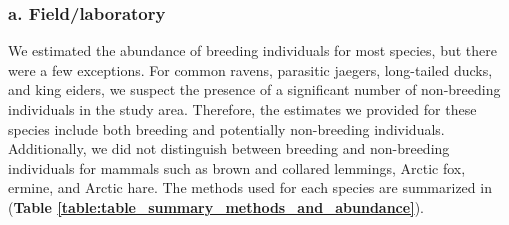 \documentclass[a4paper,twoside,12pt]{article}
\begin{document}
                \subsubsection*{a. Field/laboratory}
We estimated the abundance of breeding individuals for most species, but there were a few exceptions. For common ravens, parasitic jaegers, long-tailed ducks, and king eiders, we suspect the presence of a significant number of non-breeding individuals in the study area. Therefore, the estimates we provided for these species include both breeding and potentially non-breeding individuals. Additionally, we did not distinguish between breeding and non-breeding individuals for mammals such as brown and collared lemmings, Arctic fox, ermine, and Arctic hare. The methods used for each species are summarized in (\textbf{Table \ref{table:table_summary_methods_and_abundance}}).
\newpage
\end{document}
